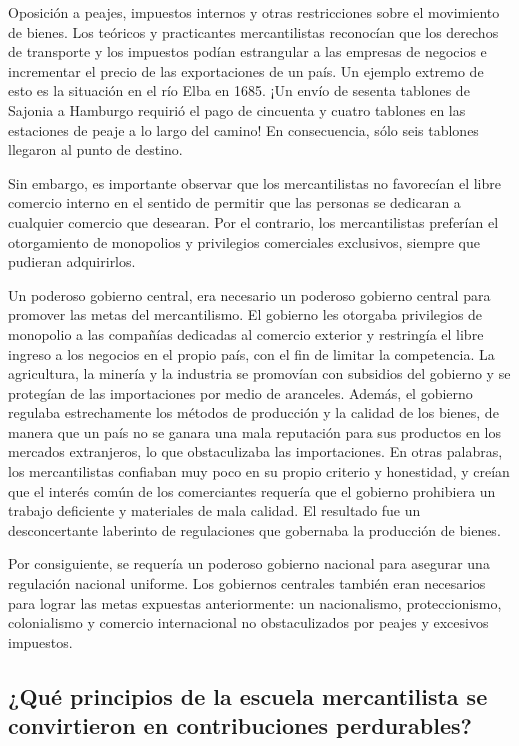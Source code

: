 \documentclass[
  stu,
  floatsintext,
  longtable,
  a4paper,
  nolmodern,
  notxfonts,
  notimes,
  12pt,
  colorlinks=true,linkcolor=blue,citecolor=blue,urlcolor=blue]{apa7}
\begin{document}
Oposición a peajes, impuestos internos y otras restricciones sobre el
movimiento de bienes. Los teóricos y practicantes mercantilistas
reconocían que los derechos de transporte y los impuestos podían
estrangular a las empresas de negocios e incrementar el precio de las
exportaciones de un país. Un ejemplo extremo de esto es la situación en
el río Elba en 1685. ¡Un envío de sesenta tablones de Sajonia a Hamburgo
requirió el pago de cincuenta y cuatro tablones en las estaciones de
peaje a lo largo del camino! En consecuencia, sólo seis tablones
llegaron al punto de destino.

Sin embargo, es importante observar que los mercantilistas no favorecían
el libre comercio interno en el sentido de permitir que las personas se
dedicaran a cualquier comercio que desearan. Por el contrario, los
mercantilistas preferían el otorgamiento de monopolios y privilegios
comerciales exclusivos, siempre que pudieran adquirirlos.

Un poderoso gobierno central, era necesario un poderoso gobierno central
para promover las metas del mercantilismo. El gobierno les otorgaba
privilegios de monopolio a las compañías dedicadas al comercio exterior
y restringía el libre ingreso a los negocios en el propio país, con el
fin de limitar la competencia. La agricultura, la minería y la industria
se promovían con subsidios del gobierno y se protegían de las
importaciones por medio de aranceles. Además, el gobierno regulaba
estrechamente los métodos de producción y la calidad de los bienes, de
manera que un país no se ganara una mala reputación para sus productos
en los mercados extranjeros, lo que obstaculizaba las importaciones. En
otras palabras, los mercantilistas confiaban muy poco en su propio
criterio y honestidad, y creían que el interés común de los comerciantes
requería que el gobierno prohibiera un trabajo deficiente y materiales
de mala calidad. El resultado fue un desconcertante laberinto de
regulaciones que gobernaba la producción de bienes.

Por consiguiente, se requería un poderoso gobierno nacional para
asegurar una regulación nacional uniforme. Los gobiernos centrales
también eran necesarios para lograr las metas expuestas anteriormente:
un nacionalismo, proteccionismo, colonialismo y comercio internacional
no obstaculizados por peajes y excesivos impuestos.

\subsection{¿Qué principios de la escuela mercantilista se convirtieron
en contribuciones
perdurables?}\label{quuxe9-principios-de-la-escuela-mercantilista-se-convirtieron-en-contribuciones-perdurables}
\end{document}
